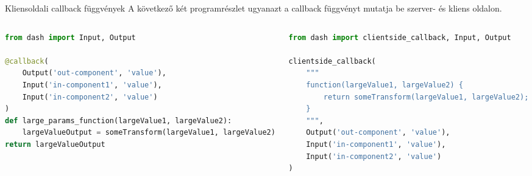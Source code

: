 \documentclass[english, aspectratio=169]{beamer}
\begin{document}
	\begin{frame}[fragile]{Kliensoldali callback függvények}
		A következő két programrészlet ugyanazt a callback függvényt mutatja be szerver- és kliens oldalon. 
		\begin{columns}
			\begin{column}{.5\textwidth}
				\begin{lstlisting}[language=python]
from dash import Input, Output

@callback(
	Output('out-component', 'value'),
	Input('in-component1', 'value'),
	Input('in-component2', 'value')
)
def large_params_function(largeValue1, largeValue2):
	largeValueOutput = someTransform(largeValue1, largeValue2)
return largeValueOutput	
				\end{lstlisting}
			\end{column}
			\begin{column}{.5\textwidth}
				\begin{lstlisting}[language=python]
from dash import clientside_callback, Input, Output

clientside_callback(
	"""
	function(largeValue1, largeValue2) {
		return someTransform(largeValue1, largeValue2);
	}
	""",
	Output('out-component', 'value'),
	Input('in-component1', 'value'),
	Input('in-component2', 'value')
)
				\end{lstlisting}
			\end{column}
		\end{columns}
	\end{frame}
\end{document}
